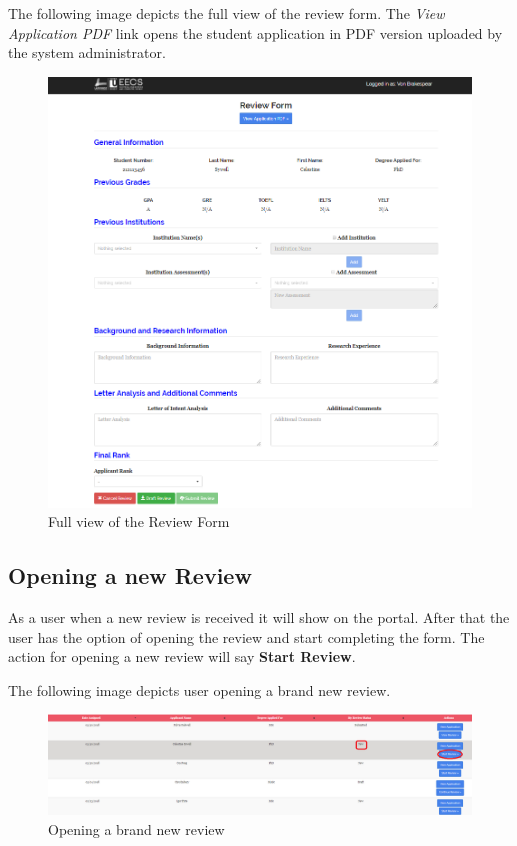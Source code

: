 \documentclass[fontsize=12pt,paper=letter,twoside]{scrartcl}
\begin{document}
\newpage
\bigskip
\noindent The following image depicts the full view of the review form. The \emph{View Application PDF} link opens the student application in PDF version uploaded by the system administrator. 

\begin{figure}[!htb]
\begin{center}
\includegraphics[width=.9\textwidth]{images/review_form.png}
\end{center}
\caption{Full view of the Review Form}
\label{fig:review_form}
\end{figure}

\clearpage
\newpage
\subsection{Opening a new Review}
As a user when a new review is received it will show on the portal. After that the user has the option of opening the review and start completing the form. The action for opening a new review will say \textbf{Start Review}.

\bigskip
\noindent The following image depicts user opening a brand new review.

\begin{figure}[!htb]
\begin{center}
\includegraphics[width=.9\textwidth]{images/opening_new_review.png}
\end{center}
\caption{Opening a brand new review}
\label{fig:opening_new_review}
\end{figure}
\end{document}
